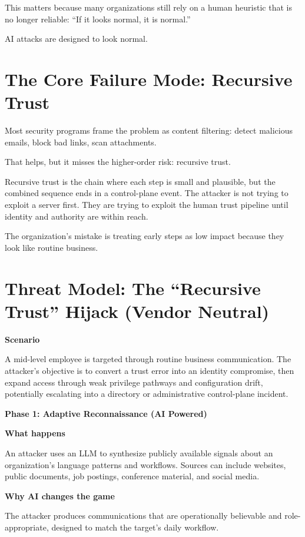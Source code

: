 \documentclass[11pt]{article}
\begin{document}
This matters because many organizations still rely on a human heuristic that is no longer reliable: ``If it looks normal, it is normal.''

AI attacks are designed to look normal.

\section{The Core Failure Mode: Recursive Trust}

Most security programs frame the problem as content filtering: detect malicious emails, block bad links, scan attachments.

That helps, but it misses the higher-order risk: recursive trust.

Recursive trust is the chain where each step is small and plausible, but the combined sequence ends in a control-plane event. The attacker is not trying to exploit a server first. They are trying to exploit the human trust pipeline until identity and authority are within reach.

The organization’s mistake is treating early steps as low impact because they look like routine business.

\section{Threat Model: The ``Recursive Trust'' Hijack (Vendor Neutral)}

\textbf{Scenario}

A mid-level employee is targeted through routine business communication. The attacker’s objective is to convert a trust error into an identity compromise, then expand access through weak privilege pathways and configuration drift, potentially escalating into a directory or administrative control-plane incident.

\textbf{Phase 1: Adaptive Reconnaissance (AI Powered)}

\textbf{What happens}

An attacker uses an LLM to synthesize publicly available signals about an organization’s language patterns and workflows. Sources can include websites, public documents, job postings, conference material, and social media.

\textbf{Why AI changes the game}

The attacker produces communications that are operationally believable and role-appropriate, designed to match the target’s daily workflow.
\end{document}
